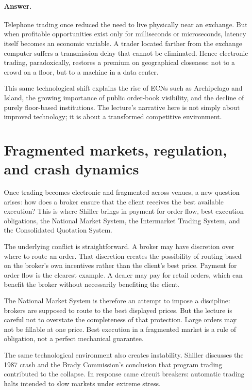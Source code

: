 \paragraph{Answer.} Telephone trading once reduced the need to live physically near an exchange. But when profitable opportunities exist only for milliseconds or microseconds, latency itself becomes an economic variable. A trader located farther from the exchange computer suffers a transmission delay that cannot be eliminated. Hence electronic trading, paradoxically, restores a premium on geographical closeness: not to a crowd on a floor, but to a machine in a data center.

This same technological shift explains the rise of ECNs such as Archipelago and Island, the growing importance of public order-book visibility, and the decline of purely floor-based institutions. The lecture's narrative here is not simply about improved technology; it is about a transformed competitive environment.

\section{Fragmented markets, regulation, and crash dynamics}

Once trading becomes electronic and fragmented across venues, a new question arises: how does a broker ensure that the client receives the best available execution? This is where Shiller brings in payment for order flow, best execution obligations, the National Market System, the Intermarket Trading System, and the Consolidated Quotation System.

The underlying conflict is straightforward. A broker may have discretion over where to route an order. That discretion creates the possibility of routing based on the broker's own incentives rather than the client's best price. Payment for order flow is the clearest example. A dealer may pay for retail orders, which can benefit the broker without necessarily benefiting the client.

The National Market System is therefore an attempt to impose a discipline: brokers are supposed to route to the best displayed prices. But the lecture is careful not to overstate the completeness of that protection. Large orders may not be fillable at one price. Best execution in a fragmented market is a rule of obligation, not a perfect mechanical guarantee.

The same technological environment also creates instability. Shiller discusses the 1987 crash and the Brady Commission's conclusion that program trading contributed to the collapse. In response came circuit breakers: automatic trading halts intended to slow markets under extreme stress.

